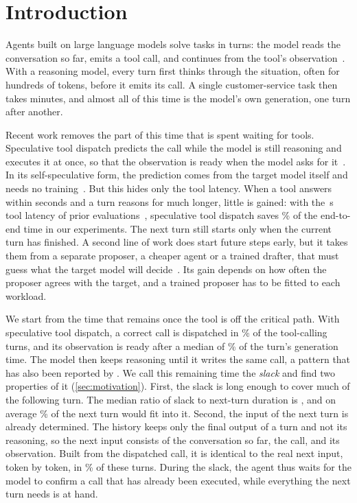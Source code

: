 \section{Introduction}
\label{sec:intro}

Agents built on large language models solve tasks in turns: the model reads the conversation so far, emits a tool call, and continues from the tool's observation~\citep{yao2023react}.
With a reasoning model, every turn first thinks through the situation, often for hundreds of tokens, before it emits its call.
A single customer-service task then takes minutes, and almost all of this time is the model's own generation, one turn after another.

Recent work removes the part of this time that is spent waiting for tools.
Speculative tool dispatch predicts the call while the model is still reasoning and executes it at once, so that the observation is ready when the model asks for it~\citep{nichols2025speculative,sui2026paste,bai2026spork}.
In its self-speculative form, the prediction comes from the target model itself and needs no training~\citep{bai2026spork}.
But this hides only the tool latency.
When a tool answers within seconds and a turn reasons for much longer, little is gained: with the \ToolLowFloor\,s tool latency of prior evaluations~\citep{bai2026spork}, speculative tool dispatch saves \DetSaveDispNone\% of the end-to-end time in our experiments.
The next turn still starts only when the current turn has finished.
A second line of work does start future steps early, but it takes them from a separate proposer, a cheaper agent or a trained drafter, that must guess what the target model will decide~\citep{hua2024isp,guan2025dsp,ye2026speculative,xu2026leap}.
Its gain depends on how often the proposer agrees with the target, and a trained proposer has to be fitted to each workload.

We start from the time that remains once the tool is off the critical path.
With speculative tool dispatch, a correct call is dispatched in \MotAnchorPct\% of the tool-calling turns, and its observation is ready after a median of \MotReadyPosPct\% of the turn's generation time.
The model then keeps reasoning until it writes the same call, a pattern that has also been reported by \citet{anon2026eta}.
We call this remaining time the \emph{slack} and find two properties of it (\cref{sec:motivation}).
First, the slack is long enough to cover much of the following turn. The median ratio of slack to next-turn duration is \MotSlackOverNext, and on average \MotNextCoveredPct\% of the next turn would fit into it.
Second, the input of the next turn is already determined.
The history keeps only the final output of a turn and not its reasoning, so the next input consists of the conversation so far, the call, and its observation.
Built from the dispatched call, it is identical to the real next input, token by token, in \MotInputSamePct\% of these turns.
During the slack, the agent thus waits for the model to confirm a call that has already been executed, while everything the next turn needs is at hand.

